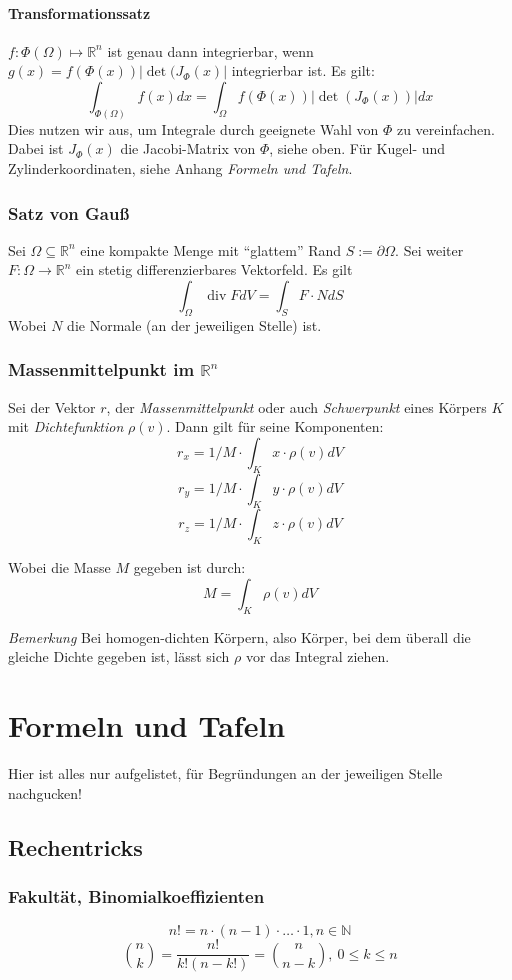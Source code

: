 \documentclass[a4paper, 9pt, DIV=24]{scrartcl}
\DeclareMathOperator{\Div}{div}
\newcommand{\N}{\mathbb{N}}
\newcommand{\R}{\mathbb{R}}
\begin{document}
\paragraph{Transformationssatz}
$f: \Phi(\Omega) \mapsto \R^n$ ist genau dann integrierbar, wenn $g(x) = f(\Phi(x))|\det(J_\Phi(x)|$ integrierbar ist.
Es gilt:
\[ \int_{\Phi(\Omega)} f(x)dx = \int_{\Omega} f(\Phi(x))|\det(J_\Phi(x))|dx\]
Dies nutzen wir aus, um Integrale durch geeignete Wahl von $\Phi$ zu vereinfachen.
Dabei ist $J_\Phi(x)$ die Jacobi-Matrix von $\Phi$, siehe oben.
Für Kugel- und Zylinderkoordinaten, siehe Anhang \emph{Formeln und Tafeln}.

\subsubsection{Satz von Gauß}
Sei $\Omega \subseteq \R^n$ eine kompakte Menge mit ``glattem'' Rand $S := \partial\Omega$.
Sei weiter $F: \Omega \rightarrow \R^n$ ein stetig differenzierbares Vektorfeld. Es gilt
\[ \int_\Omega \Div FdV = \int_S F\cdot N dS \]
Wobei $N$ die Normale (an der jeweiligen Stelle) ist.

\subsubsection{Massenmittelpunkt im $\R^n$}
Sei der Vektor $r$, der \emph{Massenmittelpunkt} oder auch \emph{Schwerpunkt} eines Körpers $K$ mit \emph{Dichtefunktion} $\rho(v)$.
Dann gilt für seine Komponenten:
\[ r_x = 1/M\cdot\int_K x\cdot \rho(v)dV \]
\[ r_y = 1/M\cdot\int_K y\cdot \rho(v)dV \]
\[ r_z = 1/M\cdot\int_K z\cdot \rho(v)dV \]

Wobei die Masse $M$ gegeben ist durch:
\[ M = \int_K \rho(v) dV \]

\emph{Bemerkung} Bei homogen-dichten Körpern, also Körper, bei dem überall die gleiche Dichte gegeben ist,
lässt sich $\rho$ vor das Integral ziehen.

\clearpage
\section{Formeln und Tafeln}
Hier ist alles nur aufgelistet, für Begründungen an der jeweiligen Stelle nachgucken!
\subsection{Rechentricks}
\subsubsection{Fakultät, Binomialkoeffizienten}
\[ n! = n\cdot(n-1)\cdot\dots\cdot1, n\in\N \]
\[ \binom{n}{k} = \frac{n!}{k!(n-k!)} = \binom{n}{n-k},\ 0 \leq k \leq n \]
\end{document}
